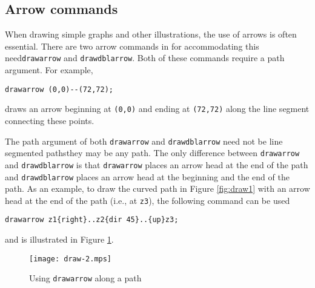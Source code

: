 \subsection{Arrow commands}

When drawing simple graphs and other illustrations, the use of arrows is
often essential.  There are two arrow commands in \MP{} for
accommodating this need\Dash \texttt{drawarrow} and
\texttt{drawdblarrow}.  Both of these commands require a path argument.
For example,

\begin{center}
  \verb|drawarrow (0,0)--(72,72);|
\end{center}

draws an arrow beginning at \verb|(0,0)| and ending at \verb|(72,72)|
along the line segment connecting these points.

The path argument of both \texttt{drawarrow} and \texttt{drawdblarrow}
need not be line segmented paths\Dash they may be any \MP{} path.  The
only difference between \texttt{drawarrow} and \texttt{drawdblarrow} is
that \texttt{drawarrow} places an arrow head at the end of the path and
\texttt{drawdblarrow} places an arrow head at the beginning and the end
of the path.  As an example, to draw the curved path in Figure
\ref{fig:draw1} with an arrow head at the end of the path (i.e., at
\texttt{z3}), the following command can be used

\begin{center}
  \verb|drawarrow z1{right}..z2{dir 45}..{up}z3;|
\end{center}

and is illustrated in Figure \ref{fig:draw2}.

\begin{figure}
  \centering
  \texttt{[image: draw-2.mps]}
  \caption{Using \texttt{drawarrow} along a path}
  \label{fig:draw2}
\end{figure}

